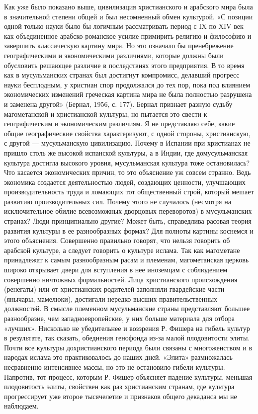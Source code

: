 Как уже было показано выше, цивилизация христианского и арабского мира
была в значительной степени общей и был несомненный обмен культурой.
«С позиции одной только науки было бы логичным рассматривать период с
IX по XIV век как объединенное арабско-романское усилие примирить
религию и философию и завершить классическую картину мира. Но это
означало бы пренебрежение географическими и экономическими различиями,
которые должны были обусловить решающее различие в последствиях этого
предприятия. В то время как в мусульманских странах был достигнут
компромисс, делавший прогресс науки бесплодным, у христиан спор
продолжался до тех пор, пока под влиянием экономических изменений
греческая картина мира не была полностью разрушена и заменена другой»
(Бернал, 1956, с. 177). Бернал признает разную судьбу магометанской и
христианской культуры, но пытается это свести к географическим и
экономическим различиям. Я не представляю себе, какие общие
географические свойства характеризуют, с одной стороны, христианскую,
с другой --- мусульманскую цивилизацию. Почему в Испании при
христианах не пришло столь же высокой испанской культуры, а в Индии,
где домусульманская культура достигла высокого уровня, мусульманская
культура тоже остановилась? Что касается экономических причин, то это
объяснение уж совсем странно. Ведь экономика создается деятельностью
людей, создающих ценности, улучшающих производительность труда и
ломающих тот общественный строй, который мешает развитию
производительных сил. Почему этого не случалось (несмотря на
исключительное обилие всевозможных дворцовых переворотов) в
мусульманских странах? Люди принципиально другие? Может быть,
справедлива расовая теория развития культуры в ее разнообразных
формах? Для полноты картины коснемся и этого объяснения. Совершенно
правильно говорят, что нельзя говорить об арабской культуре, а следует
говорить о культуре ислама. Так как магометане принадлежат к самым
разнообразным расам и племенам, магометанская церковь широко открывает
двери для вступления в нее иноземцам с соблюдением совершенно
ничтожных формальностей. Лица христианского происхождения (ренегаты)
или от христианских родителей заполняли гвардейские части (янычары,
мамелюки), достигали нередко высших правительственных должностей. В
смысле племенном мусульманские страны представляют большее
разнообразие, чем западноевропейские, у них больше материала для
отбора «лучших». Нисколько не убедительнее и воззрения Р. Фишера на
гибель культур в результате, так сказать, обеднения генофонда из-за
малой плодовитости элиты. Почти все культуры дохристианского периода
были связаны с многоженством и в народах ислама это практиковалось до
наших дней. «Элита» размножалась несравненно интенсивнее массы, но это
не остановило гибели культуры. Напротив, тот процесс, которым Р.
Фишер объясняет падение культуры, меньшая плодовитость элиты,
свойствен как раз христианским странам, где культура прогрессирует уже
второе тысячелетие и признаков общего декаданса мы не наблюдаем.

